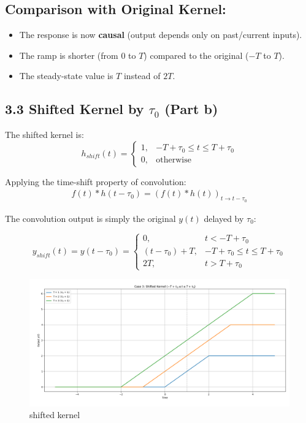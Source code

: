 \documentclass[12pt,a4paper,titlepage]{article}
\begin{document}
\subsection*{Comparison with Original Kernel:}
\begin{itemize}
    \item The response is now \textbf{causal} (output depends only on past/current inputs).
    \item The ramp is shorter (from \( 0 \) to \( T \)) compared to the original (\( -T \) to \( T \)).
    \item The steady-state value is \( T \) instead of \( 2T \).
\end{itemize}

\subsection*{3.3 Shifted Kernel by \( \tau_0 \) (Part b)}

The shifted kernel is:
\begin{equation}
h_{shift}(t) = 
\begin{cases} 
1, & -T + \tau_0 \leq t \leq T + \tau_0 \\
0, & \text{otherwise}
\end{cases}
\end{equation}

Applying the time-shift property of convolution:
\begin{align}
f(t) * h(t-\tau_0) = (f(t) * h(t))_{t \rightarrow t-\tau_0}
\end{align}

The convolution output is simply the original \( y(t) \) delayed by \( \tau_0 \):

\begin{equation}
y_{shift}(t) = y(t - \tau_0) = 
\begin{cases} 
0, & t < -T + \tau_0 \\
(t - \tau_0) + T, & -T + \tau_0 \leq t \leq T + \tau_0 \\
2T, & t > T + \tau_0 
\end{cases}
\end{equation}
\begin{figure}[H]
    \centering
    \includegraphics[width=0.8\linewidth]{plotsstep/case3step.png}
    \caption{shifted kernel}
    \label{fig:enter-label}
\end{figure}
\end{document}
